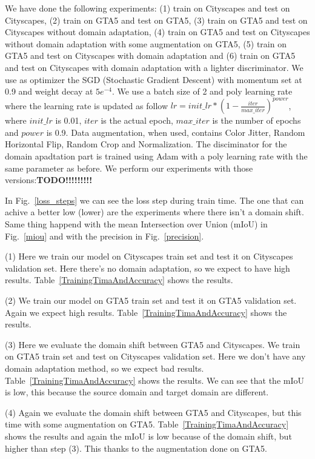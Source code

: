 \documentclass[conference]{IEEEtran}
\begin{document}
We have done the following experiments: (1) train on Cityscapes and test on Cityscapes, (2) train on GTA5 and test on GTA5, (3) train on 
GTA5 and test on Cityscapes without domain adaptation, (4) train on GTA5 and test on Cityscapes without domain adaptation with some
augmentation on GTA5, (5) train on GTA5 and test on Cityscapes with domain adaptation and (6) train on GTA5 and test on Cityscapes with
domain adaptation with a lighter discriminator. 
We use as optimizer the SGD (Stochastic Gradient Descent) with momentum set at 0.9 and weight decay at \(5e^{-4}\). We use a batch size of
2 and poly learning rate where the learning rate is updated as follow \(lr = init\_lr * (1 - \frac{iter}{max\_iter})^{power}\), where
\(init\_lr\) is 0.01, \(iter\) is the actual epoch, \(max\_iter\) is the number of epochs and \(power\) is 0.9. Data augmentation, when
used, contains Color Jitter, Random Horizontal Flip, Random Crop and Normalization. The disciminator for the domain apadtation part
is trained using Adam with a poly learning rate with the same parameter as before. 
We perform our experiments with those versions:\textbf{TODO!!!!!!!!!}

In Fig.~\ref{loss_steps} we can see the loss step during train time. The one that can achive a better low (lower) are the experiments
where there isn't a domain shift. Same thing happend with the mean Intersection over Union (mIoU) in Fig.~\ref{miou} and with the
precision in Fig.~\ref{precision}. 

(1) Here we train our model on Cityscapes train set and test it on Cityscapes validation set. Here there's no domain adaptation, so
we expect to have high results. Table~\ref{TrainingTimaAndAccuracy} shows the results.

(2) We train our model on GTA5 train set and test it on GTA5 validation set. Again we expect high results.
Table~\ref{TrainingTimaAndAccuracy} shows the results.

(3) Here we evaluate the domain shift between GTA5 and Cityscapes. We train on GTA5 train set and test on Cityscapes validation set.
Here we don't have any domain adaptation method, so we expect bad results. Table~\ref{TrainingTimaAndAccuracy} shows the results. We can
see that the mIoU is low, this because the source domain and target domain are different.

(4) Again we evaluate the domain shift between GTA5 and Cityscapes, but this time with some augmentation on GTA5. Table~\ref{TrainingTimaAndAccuracy}
shows the results and again the mIoU is low because of the domain shift, but higher than step (3). This thanks to the augmentation
done on GTA5.
\end{document}

